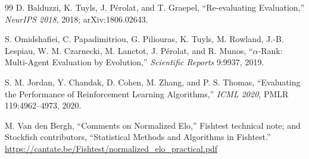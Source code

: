 \begin{thebibliography}{99}
D. Balduzzi, K. Tuyls, J. P\'erolat, and T. Graepel, ``Re-evaluating
Evaluation,'' \emph{NeurIPS 2018}, 2018; arXiv:1806.02643.

S. Omidshafiei, C. Papadimitriou, G. Piliouras, K. Tuyls, M. Rowland,
J.-B. Lespiau, W. M. Czarnecki, M. Lanctot, J. P\'erolat, and R. Munos,
``$\alpha$-Rank: Multi-Agent Evaluation by Evolution,'' \emph{Scientific
Reports} 9:9937, 2019.

S. M. Jordan, Y. Chandak, D. Cohen, M. Zhang, and P. S. Thomas, ``Evaluating the
Performance of Reinforcement Learning Algorithms,'' \emph{ICML 2020},
PMLR 119:4962--4973, 2020.

M. Van den Bergh, ``Comments on Normalized Elo,'' Fishtest technical note; and
Stockfish contributors, ``Statistical Methods and Algorithms in Fishtest.''\\
\url{https://cantate.be/Fishtest/normalized_elo_practical.pdf}

\end{thebibliography}
